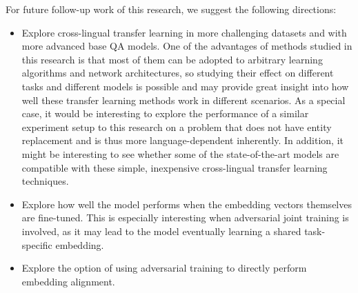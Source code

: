 \documentclass[]{article}
\begin{document}
For future follow-up work of this research, we suggest the following directions:
\begin{itemize}
	\item Explore cross-lingual transfer learning in more challenging datasets and with more advanced base QA models. One of the advantages of methods studied in this research is that most of them can be adopted to arbitrary learning algorithms and network architectures, so studying their effect on different tasks and different models is possible and may provide great insight into how well these transfer learning methods work in different scenarios. As a special case, it would be interesting to explore the performance of a similar experiment setup to this research on a problem that does not have entity replacement and is thus more language-dependent inherently. In addition, it might be interesting to see whether some of the state-of-the-art models are compatible with these simple, inexpensive cross-lingual transfer learning techniques.
	\item Explore how well the model performs when the embedding vectors themselves are fine-tuned. This is especially interesting when adversarial joint training is involved, as it may lead to the model eventually learning a shared task-specific embedding.
	\item Explore the option of using adversarial training to directly perform embedding alignment.
\end{itemize}


\newpage


\end{document}

